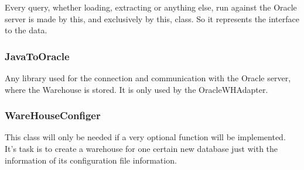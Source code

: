 Every query, whether loading, extracting or anything else, run against the Oracle server is made by this,
and exclusively by this, class. So it represents the interface to the data.



\subsubsection*{JavaToOracle}

Any library used for the connection and communication with the Oracle server, 
where the Warehouse is stored. It is only used by the OracleWHAdapter.

 

\subsubsection*{WareHouseConfiger}

This class will only be needed if a very optional function will be implemented. It's task is to create
a warehouse for one certain new database just with the information of its configuration file information.

